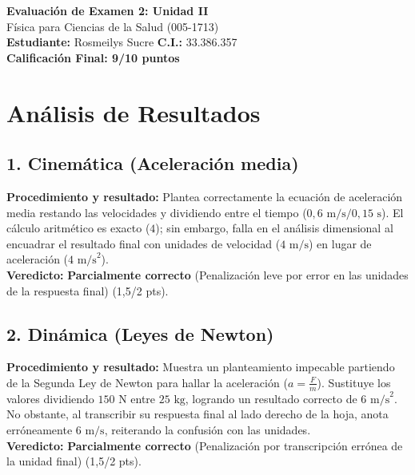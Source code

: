 \documentclass[12pt,letterpaper]{article}
\begin{document}
\begin{center}
    \Large \textbf{Evaluación de Examen 2: Unidad II} \\
    \large Física para Ciencias de la Salud (005-1713) \\
    \vspace{0.5cm}
    \textbf{Estudiante:} Rosmeilys Sucre \quad \textbf{C.I.:} 33.386.357
    \vspace{0.3cm} \\
    \large \textbf{Calificación Final: 9/10 puntos}
\end{center}

\vspace{0.5cm}

\section*{Análisis de Resultados}

\subsection*{1. Cinemática (Aceleración media)}
\textbf{Procedimiento y resultado:} Plantea correctamente la ecuación de aceleración media restando las velocidades y dividiendo entre el tiempo ($0,6 \text{ m/s} / 0,15 \text{ s}$). El cálculo aritmético es exacto ($4$); sin embargo, falla en el análisis dimensional al encuadrar el resultado final con unidades de velocidad ($4 \text{ m/s}$) en lugar de aceleración ($4 \text{ m/s}^2$). \\
\textbf{Veredicto:} \textbf{Parcialmente correcto} (Penalización leve por error en las unidades de la respuesta final) (1,5/2 pts).

\subsection*{2. Dinámica (Leyes de Newton)}
\textbf{Procedimiento y resultado:} Muestra un planteamiento impecable partiendo de la Segunda Ley de Newton para hallar la aceleración ($a = \frac{F}{m}$). Sustituye los valores dividiendo $150 \text{ N}$ entre $25 \text{ kg}$, logrando un resultado correcto de $6 \text{ m/s}^2$. No obstante, al transcribir su respuesta final al lado derecho de la hoja, anota erróneamente $6 \text{ m/s}$, reiterando la confusión con las unidades. \\
\textbf{Veredicto:} \textbf{Parcialmente correcto} (Penalización por transcripción errónea de la unidad final) (1,5/2 pts).
\end{document}
